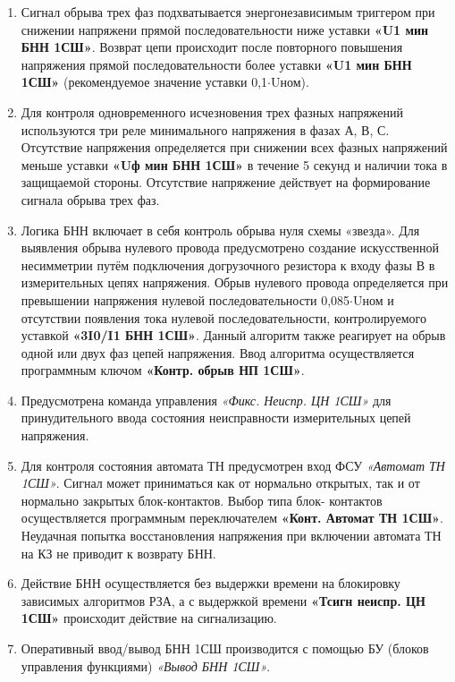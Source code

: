 \begin{enumerate}[label=\arabic{section}.\arabic{subsection}.\arabic*,  align=left, labelsep=4pt, leftmargin=0pt, itemindent=57pt]
\item
Сигнал обрыва трех фаз подхватывается энергонезависимым триггером при снижении напряжени
прямой последовательности ниже уставки \textbf{«U1 мин БНН 1СШ»}. Возврат цепи происходит после повторного
повышения напряжения прямой последовательности более уставки \textbf{«U1 мин БНН 1СШ»} (рекомендуемое значение
уставки 0,1$\cdot$Uном).

\item
Для контроля одновременного исчезновения трех фазных напряжений используются три реле
минимального напряжения в фазах А, В, С. Отсутствие напряжения определяется при снижении всех фазных
напряжений меньше уставки \textbf{«Uф мин БНН 1СШ»} в течение 5 секунд и наличии тока в защищаемой стороны.
Отсутствие напряжение действует на формирование сигнала обрыва трех фаз.

\item
Логика БНН включает в себя контроль обрыва нуля схемы «звезда». Для выявления обрыва нулевого
провода предусмотрено создание искусственной несимметрии путём подключения догрузочного резистора к
входу фазы В в измерительных цепях напряжения. Обрыв нулевого провода определяется при превышении
напряжения нулевой последовательности 0,085$\cdot$Uном и отсутствии появления тока нулевой
последовательности, контролируемого уставкой \textbf{«3I0/I1 БНН 1СШ»}. Данный алгоритм также реагирует на обрыв
одной или двух фаз цепей напряжения. Ввод алгоритма осуществляется программным ключом
\textbf{«Контр. обрыв НП 1СШ»}.

\item 
Предусмотрена команда управления \textit{«Фикс. Неиспр. ЦН 1СШ»} для принудительного ввода состояния неисправности измерительных цепей напряжения.

\item
Для контроля состояния автомата ТН предусмотрен вход ФСУ \textit{«Автомат ТН 1СШ»}. Сигнал может
приниматься как от нормально открытых, так и от нормально закрытых блок-контактов. Выбор типа блок-
контактов осуществляется программным переключателем \textbf{«Конт. Автомат ТН 1СШ»}. Неудачная попытка
восстановления напряжения при включении автомата ТН на КЗ не приводит к возврату БНН.

\item
Действие БНН осуществляется без выдержки времени на блокировку зависимых алгоритмов РЗА, а с
выдержкой времени \textbf{«Тсигн неиспр. ЦН 1СШ»} происходит действие на сигнализацию.

\item
Оперативный ввод/вывод БНН 1СШ производится с помощью БУ (блоков управления функциями) \textit{«Вывод БНН 1СШ»}. 


\end{enumerate}
